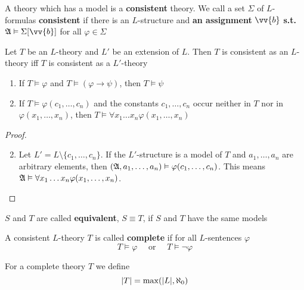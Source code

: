 \documentclass[11pt]{article}
\begin{document}
A theory which has a model is a \textbf{consistent} theory. We call a set \(\Sigma\) of
\(L\)-formulas \textbf{consistent} if there is an \(L\)-structure and \textbf{an assignment}
\(\vv{b}\) \textbf{s.t.} \(\fA\vDash\Sigma[\vv{b}]\) for all \(\varphi\in\Sigma\)

\begin{lemma}[]
Let \(T\) be an \(L\)-theory and \(L'\) be an extension of \(L\). Then \(T\)
is consistent as an \(L\)-theory iff \(T\) is consistent as a \(L'\)-theory
\end{lemma}


\begin{lemma}[]
\label{lemma1.3.4}
\begin{enumerate}
\item If \(T\vDash\varphi\) and \(T\vDash(\varphi\to\psi)\), then \(T\vDash\psi\)
\item If \(T\vDash\varphi(c_1,\dots,c_n)\) and the constants \(c_1,\dots,c_n\)
occur neither in \(T\) nor in \(\varphi(x_1,\dots,x_n)\), then
\(T\vDash\forall x_1\dots x_n\varphi(x_1,\dots,x_n)\)
\end{enumerate}
\end{lemma}

\begin{proof}
\begin{enumerate}
\setcounter{enumi}{1}
\item Let \(L'=L\setminus\{c_1,\dots,c_n\}\). If the \(L'\)-structure is a
model of \(T\) and \(a_1,\dots,a_n\) are arbitrary elements, then
\((\mathfrak{A},a_1,\dots,a_n)\vDash\varphi(c_1,\dots,c_n)\). This means
\(\mathfrak{A}\vDash\forall x_1\dots x_n\varphi(x_1,\dots,x_n)\).
\end{enumerate}
\end{proof}

\(S\) and \(T\) are called \textbf{equivalent}, \(S\equiv T\), if \(S\) and \(T\) have
the same models

\begin{definition}[]
A consistent \(L\)-theory \(T\) is called \textbf{complete} if for all \(L\)-sentences
\(\varphi\)
\begin{equation*}
T\vDash\varphi \quad\text{ or }\quad T\vDash\neg\varphi
\end{equation*}
\end{definition}

\begin{definition}[]
For a complete theory \(T\) we define
\begin{equation*}
\abs{T}=\max(\abs{L},\aleph_0)
\end{equation*}
\end{definition}
\end{document}
